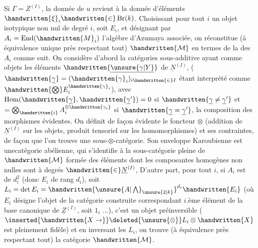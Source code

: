 
Si $\Gamma=Z^{(I)}$, la donnée de $u$ revient à la donnée d'éléments $\handwritten{\xi}_i\handwritten{\in}\operatorname{Br}(k)$. Choisissant pour tout $i$ un objet isotypique non nul de degré $i$, soit $E_i$, et désignant par $A_i=\operatorname{End}(\handwritten{M}_i)$ l'algèbre d'Azumaya associée, on réconstitue (à équivalence unique près\deleted{)} respectant tout)
$\handwritten{\mathcal{M}}$ en termes de la  des $A_i$  comme suit. On considère d'abord la catégories sous-additive  ayant comme objets les éléments $\handwritten{\underline{\unsure{\gamma|Y}}}$ de $\underline{N}^{(I)}$, ($\handwritten{\underline{\gamma}}=(\handwritten{\gamma}_i)_{i\handwritten{\in}I}$ étant interprété comme $\handwritten{\bigotimes}E_i^{\handwritten{\gamma}_i}$),  avec $\operatorname{Hom}(\handwritten{\underline{\gamma}},\handwritten{\underline{\gamma}'})=0$ si $\handwritten{\underline{\gamma}\ne\underline{\gamma}'}$ et $=\bigotimes_{\handwritten{i}} A_i^{\otimes\handwritten{\gamma_i}}$ si $\handwritten{\underline{\gamma}=\underline{\gamma}'}$, la composition des morphismes évidentes. On définit de façon évidente le foncteur $\otimes$ (addition de $\underline{N}^{(I)}$ sur les objets, produit tensoriel sur les homomorphismes) et ses contraintes, de façon que l'on trouve une sous-$\otimes$-catégorie. Son enveloppe Karoubienne est une\inserted{$\otimes$-}catégorie abélienne, qui s'identifie à la sous-catégorie pleine de $\handwritten{\mathcal{M}}$ formée des éléments dont les composantes homogènes non nulles sont à degrés $\handwritten{\in}\underline{N}^{(I)}$, D'autre part, pour tout $i$, si $A_i$ est de  $d_i^2$ (donc $E_i$ de rang $d_i$), soit $L_i=\det E_i={\handwritten{\unsure{A|\bigwedge}_{\unsure{2|k}}}}^{d_i}\handwritten{E_i}$ (où $E_i$ désigne l'objet de la catégorie construite correspondant  $i$.ème élément de la base canonique de $\underline{Z}^{(I)}$, soit $1_i$ ...), c'est un objet préinversible ($\inserted{\handwritten{X\to}}\deleted{\unsure{\otimes}}L_i\otimes\handwritten{X}$ est pleinement fidèle) et en inversant les $L_i$, on trouve (à équivalence près\deleted{)} respectant tout) la catégorie $\handwritten{\mathcal{M}}$.

